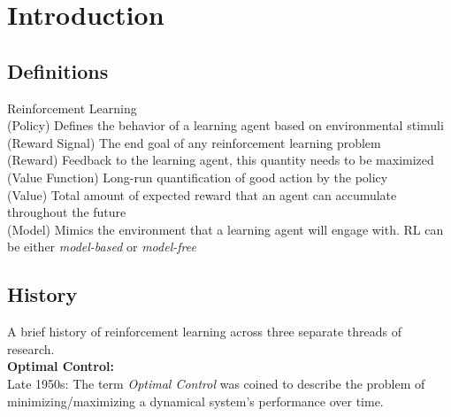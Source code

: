 \documentclass[a4paper]{article}
\begin{document}
\maketitle

\tableofcontents

\section{Introduction}
\subsection{Definitions}

\begin{defi} Reinforcement Learning\\

(Policy) Defines the behavior of a learning agent based on environmental stimuli\\

(Reward Signal) The end goal of any reinforcement learning problem\\

(Reward) Feedback to the learning agent, this quantity needs to be maximized\\

(Value Function) Long-run quantification of good action by the policy\\

(Value) Total amount of expected reward that an agent can accumulate throughout the future\\

(Model) Mimics the environment that a learning agent will engage with. RL can be either \textit{model-based} or \textit{model-free}\\

\end{defi}

\subsection{History}
A brief history of reinforcement learning across three separate threads of research.\\

\textbf{Optimal Control:}\\

Late 1950s: The term \textit{Optimal Control} was coined to describe the problem of minimizing/maximizing a dynamical system's performance over time.\\
\end{document}
